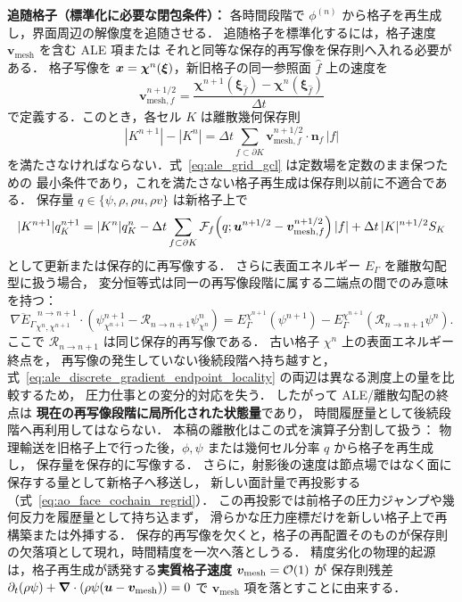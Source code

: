 \textbf{追随格子（標準化に必要な閉包条件）：}
各時間段階で $\phi^{(n)}$ から格子を再生成し，界面周辺の解像度を追随させる．
追随格子を標準化するには，格子速度 $\bm{v}_\text{mesh}$ を含む ALE 項または
それと同等な保存的再写像を保存則へ入れる必要がある．
格子写像を $\bm{x}=\bm{\chi}^{n}(\bm{\xi})$，新旧格子の同一参照面 $\hat f$ 上の速度を
\[
  \bm{v}_{\mathrm{mesh},f}^{n+1/2}
  =
  \frac{\bm{\chi}^{n+1}(\bm{\xi}_{\hat f})
        -\bm{\chi}^{n}(\bm{\xi}_{\hat f})}{\Delta t}
  \label{eq:mesh_velocity_regrid}
\]
で定義する．このとき，各セル $K$ は離散幾何保存則
\[
  |K^{n+1}|-|K^n|
  =
  \Delta t
  \sum_{f\subset\partial K}
    \bm{v}_{\mathrm{mesh},f}^{n+1/2}\cdot\bm{n}_f\, |f|
  \label{eq:ale_grid_gcl}
\]
を満たさなければならない．式~\eqref{eq:ale_grid_gcl} は定数場を定数のまま保つための
最小条件であり，これを満たさない格子再生成は保存則以前に不適合である．
保存量 $q\in\{\psi,\rho,\rho u,\rho v\}$ は新格子上で
\[
  |K^{n+1}|q_K^{n+1}
  =
  |K^n|q_K^n
  -\Delta t
  \sum_{f\subset\partial K}
    \mathcal{F}_f\!\left(q;\bm{u}^{n+1/2}
      -\bm{v}_{\mathrm{mesh},f}^{n+1/2}\right)|f|
  +\Delta t\,|K|^{n+1/2}S_K
  \label{eq:ale_conservative_update}
\]
として更新または保存的に再写像する．
さらに表面エネルギー $E_\Gamma$ を離散勾配型に扱う場合，
変分恒等式は同一の再写像段階に属する二端点の間でのみ意味を持つ：
\begin{equation}
  \overline{\nabla E_\Gamma}^{\,n\to n+1}_{\chi^n,\chi^{n+1}}
  \cdot
  \left(\psi^{n+1}_{\chi^{n+1}}-\mathcal R_{n\to n+1}\psi^n_{\chi^n}\right)
  =
  E_\Gamma^{\chi^{n+1}}(\psi^{n+1})
  -
  E_\Gamma^{\chi^{n+1}}(\mathcal R_{n\to n+1}\psi^n).
  \label{eq:ale_discrete_gradient_endpoint_locality}
\end{equation}
ここで $\mathcal R_{n\to n+1}$ は同じ保存的再写像である．
古い格子 $\chi^n$ 上の表面エネルギー終点を，
再写像の発生していない後続段階へ持ち越すと，
式~\eqref{eq:ale_discrete_gradient_endpoint_locality} の両辺は異なる測度上の量を比較するため，
圧力仕事との変分的対応を失う．
したがって ALE/離散勾配の終点は
\textbf{現在の再写像段階に局所化された状態量}であり，
時間履歴量として後続段階へ再利用してはならない．
本稿の離散化はこの式を演算子分割して扱う：
物理輸送を旧格子上で行った後，$\phi,\psi$ または幾何セル分率 $q$ から格子を再生成し，
保存量を保存的に写像する．
さらに，射影後の速度は節点場ではなく面に保存する量として新格子へ移送し，
新しい面計量で再投影する（式~\eqref{eq:ao_face_cochain_regrid}）．
この再投影では前格子の圧力ジャンプや幾何反力を履歴量として持ち込まず，
滑らかな圧力座標だけを新しい格子上で再構築または外挿する．
保存的再写像を欠くと，格子の再配置そのものが保存則の欠落項として現れ，時間精度を一次へ落としうる．
精度劣化の物理的起源は，格子再生成が誘発する\textbf{実質格子速度} $\bm{v}_\text{mesh}=\mathcal{O}(1)$ が
保存則残差 $\partial_t(\rho\psi) + \bm{\nabla}\cdot(\rho\psi(\bm{u}-\bm{v}_\text{mesh}))=0$ で
$\bm{v}_\text{mesh}$ 項を落とすことに由来する．


